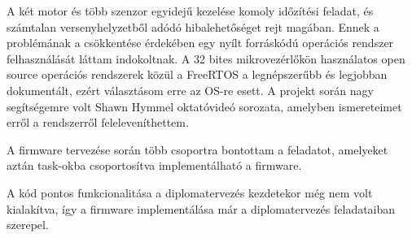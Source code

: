 A két motor és több szenzor egyidejű kezelése komoly időzítési feladat, és
számtalan versenyhelyzetből adódó hibalehetőséget rejt magában. Ennek a
problémának a csökkentése érdekében egy nyílt forráskódú operációs rendszer
felhasználását láttam indokoltnak. A 32 bites mikrovezérlőkön használatos open
source operációs rendszerek közül a FreeRTOS
a legnépszerűbb és legjobban dokumentált, ezért választásom erre az OS-re esett.
A projekt során nagy segítségemre volt  Shawn Hymmel oktatóvideó sorozata, amelyben ismereteimet erről a
rendszerről feleleveníthettem. 

A firmware tervezése során több csoportra bontottam a feladatot, amelyeket aztán
task-okba csoportosítva implementálható a firmware.


A kód pontos funkcionalitása a diplomatervezés kezdetekor még nem volt
kialakítva, így a firmware implementálása már a diplomatervezés feladataiban
szerepel.
